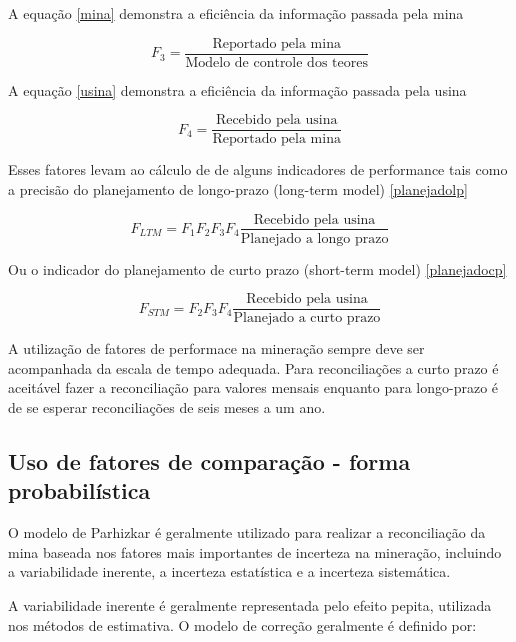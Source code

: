   A equação \eqref{mina} demonstra a eficiência da informação passada pela mina
  
    \begin{equation} \label{mina}
    F_{3} = \frac{\textrm{Reportado pela mina}}{\textrm{Modelo de controle dos teores}}
    \end{equation}
    
  A equação \eqref{usina} demonstra a eficiência da informação passada pela usina
  
     \begin{equation} \label{usina}
     F_{4} = \frac{\textrm{Recebido pela usina}}{\textrm{Reportado pela mina}}
     \end{equation}
     
  Esses fatores levam ao cálculo de de alguns indicadores de performance tais como a precisão do planejamento de longo-prazo (long-term model) \eqref{planejadolp}
  
  \begin{equation} \label{planejadolp}
  F_{LTM} = F_{1}F_{2}F_{3}F_{4} \frac{\textrm{Recebido pela usina}}{\textrm{Planejado a longo prazo}}
  \end{equation}
  
  Ou o indicador do planejamento de curto prazo (short-term model) \eqref{planejadocp} 
  
   \begin{equation} \label{planejadocp}
   F_{STM} = F_{2}F_{3}F_{4} \frac{\textrm{Recebido pela usina}}{\textrm{Planejado a curto prazo}}
   \end{equation}
   
   A utilização de fatores de performace na mineração sempre deve ser acompanhada da escala de tempo adequada. Para reconciliações a curto prazo é aceitável fazer a reconciliação para valores mensais enquanto para longo-prazo é de se esperar reconciliações de seis meses a um ano. 

 \subsection{Uso de fatores de comparação - forma probabilística}
 
 O modelo de Parhizkar é geralmente utilizado para realizar a reconciliação da mina baseada nos fatores mais importantes de incerteza na mineração, incluindo a variabilidade inerente, a incerteza estatística e a incerteza sistemática. 
 
 A variabilidade inerente é geralmente representada pelo efeito pepita, utilizada nos métodos de estimativa. O modelo de correção geralmente é definido por:
 
